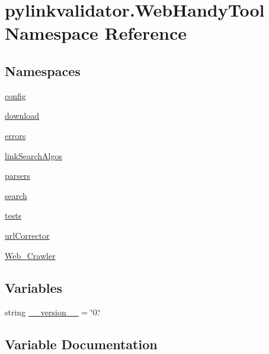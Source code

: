 \hypertarget{namespacepylinkvalidator_1_1_web_handy_tool}{}\section{pylinkvalidator.\+Web\+Handy\+Tool Namespace Reference}
\label{namespacepylinkvalidator_1_1_web_handy_tool}
\subsection*{Namespaces}
\begin{DoxyCompactItemize}
\item 
 \hyperlink{namespacepylinkvalidator_1_1_web_handy_tool_1_1config}{config}
\item 
 \hyperlink{namespacepylinkvalidator_1_1_web_handy_tool_1_1download}{download}
\item 
 \hyperlink{namespacepylinkvalidator_1_1_web_handy_tool_1_1errors}{errors}
\item 
 \hyperlink{namespacepylinkvalidator_1_1_web_handy_tool_1_1link_search_algos}{link\+Search\+Algos}
\item 
 \hyperlink{namespacepylinkvalidator_1_1_web_handy_tool_1_1parsers}{parsers}
\item 
 \hyperlink{namespacepylinkvalidator_1_1_web_handy_tool_1_1search}{search}
\item 
 \hyperlink{namespacepylinkvalidator_1_1_web_handy_tool_1_1tests}{tests}
\item 
 \hyperlink{namespacepylinkvalidator_1_1_web_handy_tool_1_1url_corrector}{url\+Corrector}
\item 
 \hyperlink{namespacepylinkvalidator_1_1_web_handy_tool_1_1_web___crawler}{Web\+\_\+\+Crawler}
\end{DoxyCompactItemize}
\subsection*{Variables}
\begin{DoxyCompactItemize}
\item 
string \hyperlink{namespacepylinkvalidator_1_1_web_handy_tool_aa28b35e25a140274f3d623a89fc7d0ee}{\+\_\+\+\_\+version\+\_\+\+\_\+} = \char`\"{}0.\char`\"{}
\end{DoxyCompactItemize}


\subsection{Variable Documentation}
